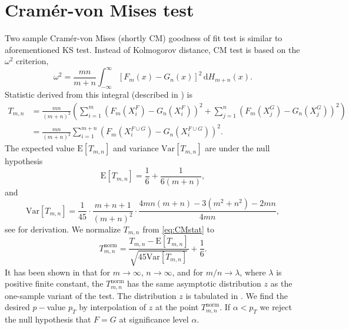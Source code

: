 \section{Cram\'{e}r-von Mises test}
Two sample Cram\'{e}r-von Mises (shortly CM)  goodness of fit test is similar to aforementioned KS test. Instead of Kolmogorov distance, CM test  is based on the $\omega^2$ criterion,
\begin{equation}
\omega^2 = \frac{mn}{m+n} \int_{-\infty}^\infty \left[F_m(x) - G_n(x) \right]^2 \,\mathrm{d} H_{m+n}(x).
\end{equation} 
Statistic derived from this integral (described in \cite{Anderson1962}) is
\begin{align}
T_{m,n} & = \frac{mn}{(m+n)^2}\left( \sum_{i=1}^m \left( F_m\left(X^F_i\right) - G_n\left(X^F_i\right)\right)^2 + \sum_{j=1}^n \left( F_m\left(X^G_j\right) - G_n\left(X^G_j\right)\right)^2 \right) \\
& = \frac{mn}{(m+n)^2} \sum_{i=1}^{m+n} \left( F_m\left(X^{F\cup G}_i\right) - G_n\left(X^{F\cup G}_i\right)\right)^2 .
\label{eq:CMstat} %
\end{align}
The expected value $\mathrm{E} [T_{m,n}]$ and variance $\mathrm{Var} [T_{m,n}]$ are %
under the null hypothesis 
\begin{equation}
\mathrm{E} [T_{m,n}] = \frac{1}{6} + \frac{1}{6(m+n)},
\end{equation}
and
\begin{equation}
\mathrm{Var} [T_{m,n}] = \frac{1}{45} \cdot \frac{m+n+1}{(m+n)^2} \cdot \frac{4mn(m+n) - 3(m^2 + n^2)-2mn}{4mn},
\end{equation}
see \cite{Anderson1962} for derivation. We normalize $T_{m,n}$ from \eqref{eq:CMstat} to
\begin{equation}
T_{m,n}^\mathrm{norm} = \frac{T_{m,n}-\mathrm{E}[T_{m,n}]}{\sqrt{45\mathrm{Var}[T_{m,n}]}} + \frac{1}{6}.
\label{eq:CMstat-lim}
\end{equation}
It has been shown in \cite{Rosenblatt1952} that for $m \rightarrow \infty$, $n \rightarrow \infty$, and for ${m}/{n} \rightarrow \lambda$, where $\lambda$ is positive finite constant, the  $T_{m,n}^\mathrm{norm}$ has the same asymptotic distribution $z$ as the one-sample variant of the test. The distribution $z$ is tabulated  in \cite{AndersonDarling1952}. We find the desired $p-$value $p_T$ by interpolation of $z$ at the point $T_{m,n}^\mathrm{norm}$. If $\alpha < p_T$ we reject the null hypothesis that $F = G $ at significance level $\alpha$.

